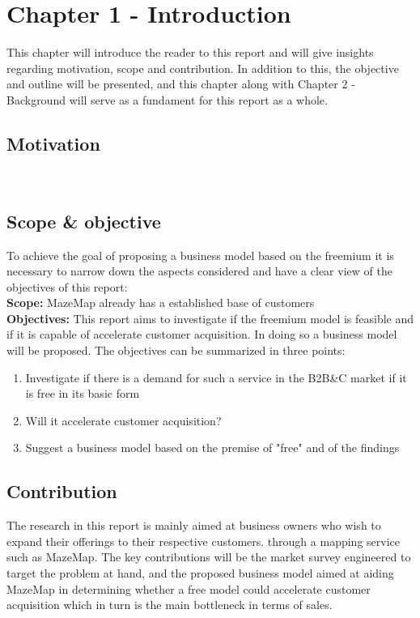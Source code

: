 \chapter{Chapter 1 - Introduction}
This chapter will introduce the reader to this report and will give insights regarding motivation, scope and contribution. In addition to this, the objective and outline will be presented, and this chapter along with Chapter 2 - Background will serve as a fundament for this report as a whole.
\section {Motivation}
\newline
\\
\section {Scope \& objective}
To achieve the goal of proposing a business model based on the freemium it is necessary to narrow down the aspects considered and have a clear view of the objectives of this report:
\newline
\\
\textbf{Scope: }MazeMap already has a established base of customers
\newline
\\
\textbf{Objectives: }This report aims to investigate if the freemium model is feasible and if it is capable of accelerate customer acquisition. In doing so a business model will be proposed. The objectives can be summarized in three points:
\begin{enumerate}
\item Investigate if there is a demand for such a service in the B2B\&C market if it is free in its basic form
\item Will it accelerate customer acquisition?
\item Suggest a business model based on the premise of "free" and of the findings
\end{enumerate}
\section {Contribution}
The research in this report is mainly aimed at business owners who wish to expand their offerings to their respective customers. through a mapping service such as MazeMap. The key contributions will be the market survey engineered to target the problem at hand, and the proposed business model aimed at aiding MazeMap in determining whether a free model could accelerate customer acquisition which in turn is the main bottleneck in terms of sales.
